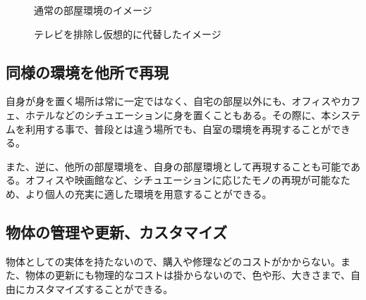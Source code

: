 \begin{figure}[htbp]
    \begin{minipage}{0.5\hsize}
      \begin{center}
      \end{center}
      \caption{通常の部屋環境のイメージ}
    \end{minipage}
    \begin{minipage}{0.5\hsize}
      \begin{center}
      \end{center}
      \caption{テレビを排除し仮想的に代替したイメージ}
    \end{minipage}
  \end{figure}

\subsection{同様の環境を他所で再現}

自身が身を置く場所は常に一定ではなく、自宅の部屋以外にも、オフィスやカフェ、ホテルなどのシチュエーションに身を置くこともある。その際に、本システムを利用する事で、普段とは違う場所でも、自室の環境を再現することができる。

また、逆に、他所の部屋環境を、自身の部屋環境として再現することも可能である。オフィスや映画館など、シチュエーションに応じたモノの再現が可能なため、より個人の充実に適した環境を用意することができる。

\subsection{物体の管理や更新、カスタマイズ}

物体としての実体を持たないので、購入や修理などのコストがかからない。また、物体の更新にも物理的なコストは掛からないので、色や形、大きさまで、自由にカスタマイズすることができる。

